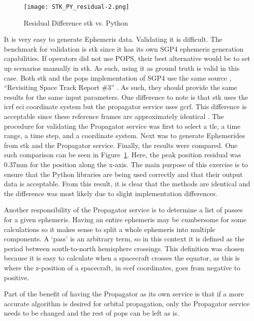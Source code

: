 \begin{figure}[h]
    \centering
    \texttt{[image: STK\_PY\_residual-2.png]} 
    \caption{Residual Difference \gls{stk} vs. Python}
    \label{fig:stk_py} 
\end{figure}

It is very easy to generate Ephemeris data. Validating it is difficult.  The
benchmark for validation is \gls{stk} since it has its own SGP4 ephemeris
generation capabilities. If operators did not use POPS, their best alternative
would be to set up scenarios manually in \gls{stk}. As such, using it as ground
truth is valid in this case. Both \gls{stk} and the \gls{pops} implementation
of SGP4 use the same source \cite{kelso_celestrak_2022}, ``Revisiting Space
Track Report \#3'' \cite{vallado_revisiting_2006}.  As such, they should
provide the same results for the same input parameters.  One difference to note
is that \gls{stk} uses the \gls{icrf} \gls{eci} coordinate system but the
propagator service uses \gls{gcrf}.  This difference is acceptable since these
reference frames are approximately identical \cite{kaplan_iau_2006}.  The
procedure for validating the Propagator service was first to select a
\gls{tle}, a time range, a time step, and a coordinate system.  Next was to
generate Ephemerides from \gls{stk} and the Propagator service.  Finally, the
results were compared. One such comparison can be seen in
Figure~\ref{fig:stk_py}. Here, the peak position residual was 0.37mm for the
position along the x-axis. The main purpose of this exercise is to ensure that
the Python libraries are being used correctly and that their output data is
acceptable.  From this result, it is clear that the methods are identical and
the difference was most likely due to slight implementation differences. 

Another responsibility of the Propagator service is to determine a list of
passes for a given ephemeris. Having an entire ephemeris may be cumbersome for
some calculations so it makes sense to split a whole ephemeris into multiple
components. A `pass' is an arbitrary term, so in this context it is defined as
the period between south-to-north hemisphere crossings. This definition was
chosen because it is easy to calculate when a spacecraft crosses the equator,
as this is where the z-position of a spacecraft, in \gls{ecef} coordinates,
goes from negative to positive.  


Part of the benefit of having the Propagator as its own service is that if a
more accurate algorithm is desired for orbital propagation, only the Propagator
service needs to be changed and the rest of \gls{pops} can be left as is.


